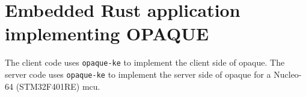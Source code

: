 \chapter{Embedded Rust application implementing OPAQUE}
\label{chap:appendix-opaque-embedded}

The client code uses \texttt{opaque-ke} to implement the client side of \gls{opaque}.
The server code uses \texttt{opaque-ke} to implement the server side of \gls{opaque} for a Nucleo-64 (STM32F401RE) \gls{mcu}.


